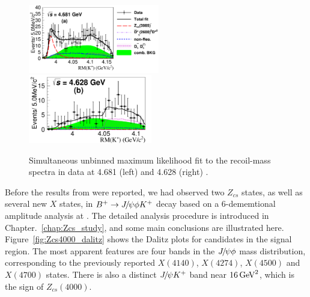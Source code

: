 \begin{figure}[!hbtp]
\centering
   \includegraphics[width=0.51\textwidth]{Figures/01_Introduction/Exotic/Zcs/data_4680_Simulfit_withsig-eps-converted-to} %
   \includegraphics[width=0.48\textwidth]{Figures/01_Introduction/Exotic/Zcs/data_4626_Simulfit_withsig-eps-converted-to} %
   \caption{ 
   Simultaneous unbinned maximum likelihood fit to the \Kp recoil-mass spectra in data at 4.681 \gev (left) and 4.628 \gev (right)
   \supercite{Ablikim:2020hsk}.}
\label{fig:Zcs3985}
\end{figure}

Before the results from \besiii were reported, 
we had observed two $Z_{cs}$ states,
as well as several new $X$ states,
in ${{{B}^+}}\rightarrow{\ensuremath{{J\mskip -3mu/\mskip -2mu\psi}}}\phi{\ensuremath{{K}^+}}$ decay based on a 6-dememtional amplitude analysis at \lhcb.
The detailed analysis procedure is introduced in Chapter.~\ref{chap:Zcs_study},
and some main conclusions are illustrated here.
Figure~\ref{fig:Zcs4000_dalitz} shows the Dalitz plots for \Bp candidates in the signal region.
The most apparent features are four bands in the ${{J\mskip -3mu/\mskip -2mu\psi}}\phi$ mass distribution, 
corresponding to the previously reported $X(4140)$, $X(4274)$, $X(4500)$ and $X(4700)$ states.
There is also a distinct ${{J\mskip -3mu/\mskip -2mu\psi}}{{K}^+}$ band near $16\text{\,Ge\kern -0.1em V}^2$,
which is the sign of $Z_{cs}(4000)$.

